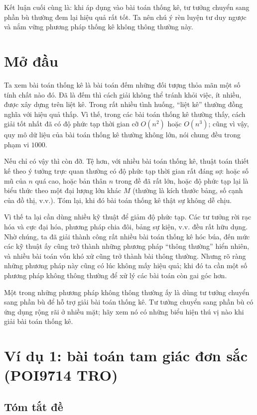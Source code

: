 \documentclass[11pt]{article}
\begin{document}
Kết luận cuối cùng là: khi áp dụng vào bài toán thống kê, tư tưởng chuyển
sang phần bù thường đem lại hiệu quả rất tốt. Ta nên chú ý rèn luyện tư
duy ngược và nắm vững phương pháp thống kê không thông thường này.

\section{Mở đầu}

Ta xem bài toán thống kê là bài toán đếm những đối tượng thỏa mãn một số
tính chất nào đó. Đã là đếm thì cách giải không thể tránh khỏi việc, ít
nhiều, được xây dựng trên liệt kê. Trong rất nhiều tình huống, ``liệt
kê'' thường đồng nghĩa với hiệu quả thấp. Vì thế, trong các bài toán
thống kê thường thấy, cách giải tốt nhất đã có độ phức tạp thời gian cỡ
\(O(n^2)\) hoặc \(O(n^3)\); cũng vì vậy, quy mô dữ liệu của bài toán
thống kê thường không lớn, nói chung đều trong phạm vi \(1000\).

Nếu chỉ có vậy thì còn đỡ. Tệ hơn, với nhiều bài toán thống kê, thuật
toán thiết kế theo ý tưởng trực quan thường có độ phức tạp thời gian rất
đáng sợ: hoặc số mũ của \(n\) quá cao, hoặc bản thân \(n\) trong đề đã
rất lớn, hoặc độ phức tạp lại là biểu thức theo một đại lượng lớn khác
\(M\) (thường là kích thước bảng, số cạnh của đồ thị, v.v.). Tóm lại,
khi đó bài toán thống kê thật sự không dễ chịu.

Vì thế ta lại cần dùng nhiều kỹ thuật để giảm độ phức tạp. Các tư tưởng
rời rạc hóa và cực đại hóa, phương pháp chia đôi, bảng sự kiện, v.v. đều
rất hữu dụng. Nhờ chúng, ta đã giải thành công rất nhiều bài toán thống
kê hóc búa, đến mức các kỹ thuật ấy cũng trở thành những phương pháp
``thông thường'' hiển nhiên, và nhiều bài toán vốn khó xử cũng trở thành
bài thông thường. Nhưng rõ ràng những phương pháp này cũng có lúc không
mấy hiệu quả; khi đó ta cần một số phương pháp không thông thường để xử
lý các bài toán còn gai góc hơn.

Một trong những phương pháp không thông thường ấy là dùng tư tưởng chuyển
sang phần bù để hỗ trợ giải bài toán thống kê. Tư tưởng chuyển sang phần
bù có ứng dụng rộng rãi ở nhiều mặt; hãy xem nó có những biểu hiện thú vị
nào khi giải bài toán thống kê.

\section{Ví dụ 1: bài toán tam giác đơn sắc (POI9714 TRO)}

\subsection{Tóm tắt đề}
\end{document}
